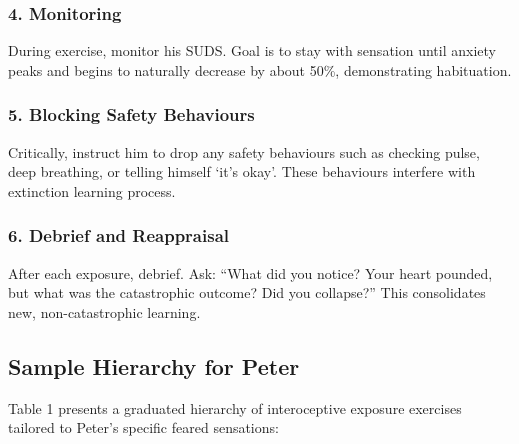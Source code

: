 \documentclass[
  american,
  letterpaper,
  DIV=11,
  numbers=noendperiod]{scrartcl}
\begin{document}
\subsubsection{4. Monitoring}\label{monitoring}

During exercise, monitor his SUDS. Goal is to stay with sensation until
anxiety peaks and begins to naturally decrease by about 50\%,
demonstrating habituation.

\subsubsection{5. Blocking Safety
Behaviours}\label{blocking-safety-behaviours}

Critically, instruct him to drop any safety behaviours such as checking
pulse, deep breathing, or telling himself `it's okay'. These behaviours
interfere with extinction learning process.

\subsubsection{6. Debrief and
Reappraisal}\label{debrief-and-reappraisal}

After each exposure, debrief. Ask: ``What did you notice? Your heart
pounded, but what was the catastrophic outcome? Did you collapse?'' This
consolidates new, non-catastrophic learning.

\subsection{Sample Hierarchy for
Peter}\label{sample-hierarchy-for-peter}

Table 1 presents a graduated hierarchy of interoceptive exposure
exercises tailored to Peter's specific feared sensations:
\end{document}
